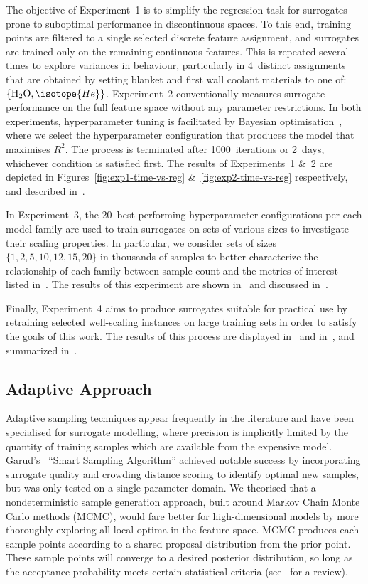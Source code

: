 The objective of Experiment~1 is to simplify the regression task for
surrogates prone to suboptimal performance in discontinuous spaces.
To this end, training points are filtered to a single selected discrete feature
assignment, and surrogates are trained only on the remaining continuous features.
This is repeated several times to explore variances in behaviour,
particularly in 4~distinct assignments that are obtained by setting blanket and
first wall coolant materials to one
of:~$\{\text{H\textsubscript{2}O},\isotope{He}\}$.
Experiment~2 conventionally measures surrogate performance on the full feature
space without any parameter restrictions. In both experiments, hyperparameter tuning is
facilitated by Bayesian optimisation~\cite{movckus1975bayesian}, where we select the
hyperparameter configuration that produces the model that maximises $R^2$. The
process is terminated after 1000~iterations or 2~days, whichever condition is satisfied first.
The results of Experiments~1 \&~2 are depicted
in Figures~\ref{fig:exp1-time-vs-reg} \&~\ref{fig:exp2-time-vs-reg}
respectively, and described in~.

In Experiment~3, the 20~best-performing hyperparameter configurations
per each model family are used to train surrogates on sets of various sizes to
investigate their scaling properties. In particular, we consider sets of
sizes~$\{1,2,5,10,12,15,20\}$ in thousands of samples to better characterize the
relationship of each family between sample count and the metrics of interest
listed in~.
The results of this experiment are shown in~ and discussed
in~.

Finally, Experiment~4 aims
to produce surrogates suitable for practical use by retraining selected
well-scaling instances on large training sets in order to satisfy the goals of this work.
The results of this process are displayed in~ and
in~, and summarized in~.


\subsection{Adaptive Approach}\label{sec:adaptive}

Adaptive sampling techniques appear frequently in the literature and have been specialised for surrogate modelling, where precision is implicitly limited by the quantity of training samples which are available from the expensive model. Garud's~\cite{Garud2016} ``Smart Sampling Algorithm'' achieved notable success by incorporating surrogate quality and
crowding distance scoring to identify optimal new samples, but was only tested
on a single-parameter domain. We theorised that a nondeterministic sample
generation approach, built around Markov Chain Monte Carlo methods (MCMC), would
fare better for high-dimensional models by more thoroughly exploring all local
optima in the feature space. MCMC produces each sample points according to a shared proposal
distribution from the prior point. These sample points will converge to a desired posterior
distribution, so long as the acceptance probability meets certain statistical criteria (see~\cite{Zhou2018} for a review).

